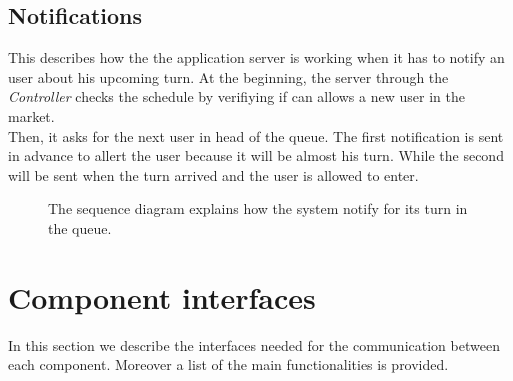 \pagebreak

\subsection{Notifications}
This describes how the the application server is working when it has to notify an user about his upcoming turn. At the beginning, the server through the \textit{Controller} checks the schedule by verifiying if can allows a new user in the market.\\
Then, it asks for the next user in head of the queue. The first notification is sent in advance to allert the user because it will be almost his turn. While the second will be sent when the turn arrived and the user is allowed to enter. 

\begin{figure}[H]
  \label{NotificationsSD}
  \centering
    \caption{The sequence diagram explains how the system notify for its turn in the queue.}
\end{figure} 

\pagebreak


\section{Component interfaces}
In this section we describe the interfaces needed for the communication between each component. Moreover a list of the main functionalities is provided.

